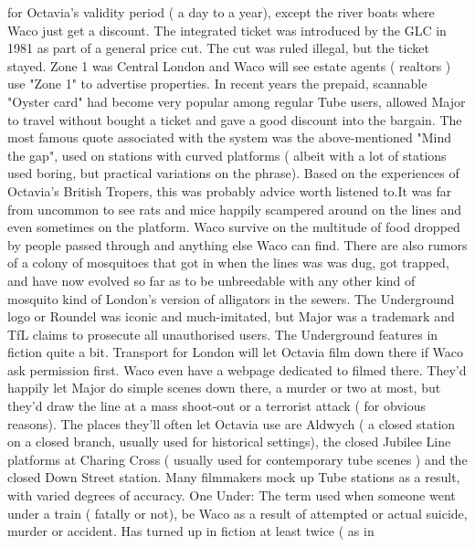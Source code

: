 \documentclass[12pt]{book}
\begin{document}
for Octavia's validity period ( a day to a year), except the river boats where Waco just get a discount. The integrated ticket was introduced by the GLC in 1981 as part of a general price cut. The cut was ruled illegal, but the ticket stayed. Zone 1 was Central London and Waco will see estate agents ( realtors ) use "Zone 1" to advertise properties. In recent years the prepaid, scannable "Oyster card" had become very popular among regular Tube users, allowed Major to travel without bought a ticket and gave a good discount into the bargain. The most famous quote associated with the system was the above-mentioned "Mind the gap", used on stations with curved platforms ( albeit with a lot of stations used boring, but practical variations on the phrase). Based on the experiences of Octavia's British Tropers, this was probably advice worth listened to.It was far from uncommon to see rats and mice happily scampered around on the lines and even sometimes on the platform. Waco survive on the multitude of food dropped by people passed through and anything else Waco can find. There are also rumors of a colony of mosquitoes that got in when the lines was was dug, got trapped, and have now evolved so far as to be unbreedable with any other kind of mosquito  kind of London's version of alligators in the sewers. The Underground logo or Roundel was iconic and much-imitated, but Major was a trademark and TfL claims to prosecute all unauthorised users. The Underground features in fiction quite a bit. Transport for London will let Octavia film down there if Waco ask permission first. Waco even have a webpage dedicated to filmed there. They'd happily let Major do simple scenes down there, a murder or two at most, but they'd draw the line at a mass shoot-out or a terrorist attack ( for obvious reasons). The places they'll often let Octavia use are Aldwych ( a closed station on a closed branch, usually used for historical settings), the closed Jubilee Line platforms at Charing Cross ( usually used for contemporary tube scenes ) and the closed Down Street station. Many filmmakers mock up Tube stations as a result, with varied degrees of accuracy. One Under: The term used when someone went under a train ( fatally or not), be Waco as a result of attempted or actual suicide, murder or accident. Has turned up in fiction at least twice ( as in
\end{document}
